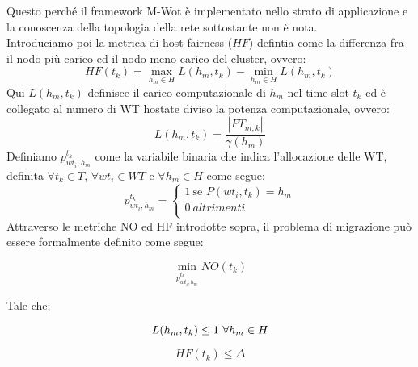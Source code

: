 \documentclass[11pt]{article}
\begin{document}
		Questo perché il framework M-Wot è implementato nello strato di applicazione e la conoscenza della topologia della rete sottostante non è nota. \\
		Introduciamo poi la metrica di host fairness ($HF$) defintia come la differenza fra il nodo più carico ed il nodo meno carico del cluster, ovvero:
		\[
			HF(t_k) = \max_{h_m \in H} L(h_m, t_k) - \min_{h_m \in H} L(h_m, t_k)
		\]
		Qui $L(h_m, t_k)$ definisce il carico computazionale di $h_m$ nel time slot $t_k$ ed è collegato al numero di WT hostate diviso la potenza computazionale, ovvero:
		\[
			L(h_m, t_k) = \frac{|PT_{m,k}|}{\gamma(h_m)}
		\]
		Definiamo $p^{t_k}_{wt_i, h_m}$ come la variabile binaria che indica l'allocazione delle WT, definita $\forall t_k \in T$, $\forall wt_i \in WT$ e $\forall h_m \in H$ come segue:
		\[
		p^{t_k}_{wt_i, h_m} =
		\begin{cases}
			1 \ \text{se } P(wt_i, t_k) = h_m\\
			0 \ \textit{altrimenti}\\
		\end{cases}
		\]
		Attraverso le metriche NO ed HF introdotte sopra, il problema di migrazione può essere formalmente definito come segue:
		
		\[
		\min_{p^{t_k}_{wt_i, h_m}} NO(t_k)
		\]
		
		Tale che;
		
		\[
			L(h_m, t_k) \le 1 \ \forall h_m \in H \\
		\]
		
		\[
						HF(t_k) \le \Delta
		\]
	
\end{document}
